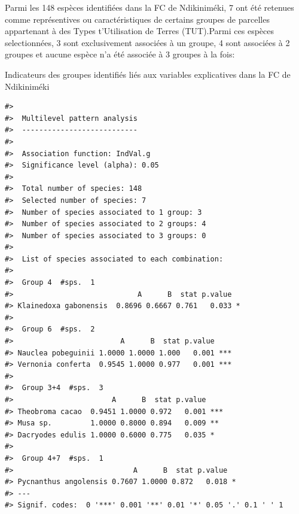 \documentclass[
  12pt,
  a4paper,
  extrafontsizes,
  onecolumn,
  openright]{book}
\theoremstyle{definition}
\theoremstyle{definition}
\theoremstyle{definition}
\theoremstyle{definition}
\theoremstyle{remark}
\begin{document}
Parmi les 148 espèces identifiées dans la FC de Ndikiniméki, 7 ont été retenues comme représentives ou caractéristiques de certains groupes de parcelles appartenant à des Types t'Utilisation de Terres (TUT).Parmi ces espèces selectionnées, 3 sont exclusivement associées à un groupe, 4 sont associées à 2 groupes et aucune espèce n'a été associée à 3 groupes à la fois:

Indicateurs des groupes identifiés liés aux variables explicatives dans la FC de Ndikiniméki

\begin{verbatim}
#> 
#>  Multilevel pattern analysis
#>  ---------------------------
#> 
#>  Association function: IndVal.g
#>  Significance level (alpha): 0.05
#> 
#>  Total number of species: 148
#>  Selected number of species: 7 
#>  Number of species associated to 1 group: 3 
#>  Number of species associated to 2 groups: 4 
#>  Number of species associated to 3 groups: 0 
#> 
#>  List of species associated to each combination: 
#> 
#>  Group 4  #sps.  1 
#>                             A      B  stat p.value  
#> Klainedoxa gabonensis  0.8696 0.6667 0.761   0.033 *
#> 
#>  Group 6  #sps.  2 
#>                         A      B  stat p.value    
#> Nauclea pobeguinii 1.0000 1.0000 1.000   0.001 ***
#> Vernonia conferta  0.9545 1.0000 0.977   0.001 ***
#> 
#>  Group 3+4  #sps.  3 
#>                       A      B  stat p.value    
#> Theobroma cacao  0.9451 1.0000 0.972   0.001 ***
#> Musa sp.         1.0000 0.8000 0.894   0.009 ** 
#> Dacryodes edulis 1.0000 0.6000 0.775   0.035 *  
#> 
#>  Group 4+7  #sps.  1 
#>                            A      B  stat p.value  
#> Pycnanthus angolensis 0.7607 1.0000 0.872   0.018 *
#> ---
#> Signif. codes:  0 '***' 0.001 '**' 0.01 '*' 0.05 '.' 0.1 ' ' 1
\end{verbatim}
\end{document}
